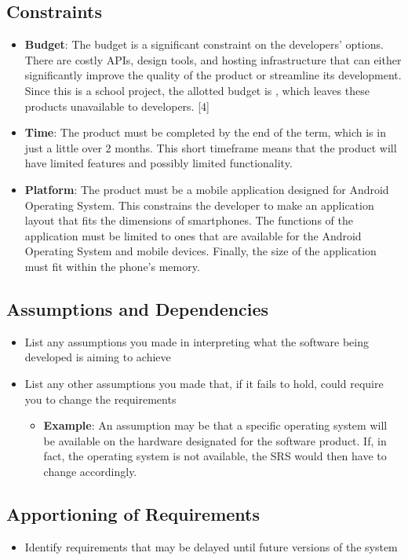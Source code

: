 
\subsection{Constraints}
\label{sub:constraints}
\begin{itemize}
	\item \textbf{Budget}: The budget is a significant constraint on the developers' options. There are costly APIs, design tools, and hosting infrastructure that can either significantly improve the quality of the product or streamline its development. Since this is a school project, the allotted budget is , which leaves these products unavailable to developers. [4]
	\item \textbf{Time}: The product must be completed by the end of the term, which is in just a little over 2 months. This short timeframe means that the product will have limited features and possibly limited functionality.
	\item \textbf{Platform}: The product must be a mobile application designed for Android Operating System. This constrains the developer to make an application layout that fits the dimensions of smartphones. The functions of the application must be limited to ones that are available for the Android Operating System and mobile devices. Finally, the size of the application must fit within the phone's memory.
\end{itemize}


\subsection{Assumptions and Dependencies}
\label{sub:assumptions_and_dependencies}
\begin{itemize}
	\item List any assumptions you made in interpreting what the software being developed is aiming to achieve
	\item List any other assumptions you made that, if it fails to hold, could require you to change the requirements
	\begin{itemize}
		\item \textbf{Example}: An assumption may be that a specific operating system will be available on the hardware designated for the software product. If, in fact, the operating system is not available, the SRS would then have to change accordingly.
	\end{itemize}
\end{itemize}

\subsection{Apportioning of Requirements}
\label{sub:apportioning_of_requirements}
\begin{itemize}
	\item Identify requirements that may be delayed until future versions of the system
\end{itemize}

